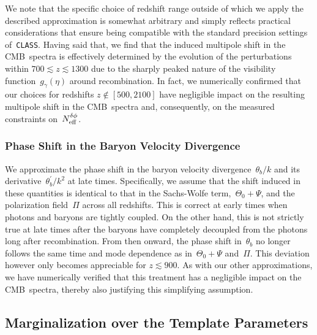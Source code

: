 \begin{subappendices}
We note that the specific choice of redshift range outside of which we apply the described approximation is somewhat arbitrary and simply reflects practical considerations that ensure being compatible with the standard precision settings of~\texttt{CLASS}. Having said that, we find that the induced multipole shift in the CMB~spectra is effectively determined by the evolution of the perturbations within $700 \lesssim z \lesssim 1300$ due to the sharply peaked nature of the visibility function~$g_\gamma(\eta)$ around recombination. In fact, we numerically confirmed that our choices for redshifts $z \notin [500, 2100]$ have negligible impact on the resulting multipole shift in the CMB~spectra and, consequently, on the measured constraints on~$N_\mathrm{eff}^{\delta\phi}$.


\subsubsection*{Phase Shift in the Baryon Velocity Divergence}

We approximate the phase shift in the baryon velocity divergence~$\theta_b/k$ and its derivative~$\theta_b^\prime/k^2$ at late times. Specifically, we assume that the shift induced in these quantities is identical to that in the Sachs-Wolfe term,~$\Theta_0+\Psi$, and the polarization field~$\Pi$ across all redshifts. This is correct at early times when photons and baryons are tightly coupled. On the other hand, this is not strictly true at late times after the baryons have completely decoupled from the photons long after recombination. From then onward, the phase shift in~$\theta_b$ no longer follows the same time and mode dependence as in~$\Theta_0 + \Psi$ and~$\Pi$. This deviation however only becomes appreciable for $z \lesssim 900$. As with our other approximations, we have numerically verified that this treatment has a negligible impact on the CMB~spectra, thereby also justifying this simplifying assumption.


\subsection{Marginalization over the Template Parameters}
\label{ch12-app:pbt-marginalization}


\end{subappendices}
